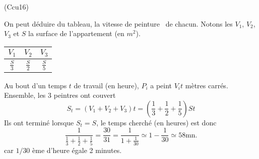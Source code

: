 \begin{tiny}(Ccu16)\end{tiny} On peut déduire du tableau, la \og vitesse de peinture\fg~ de chacun. Notons les $V_1$, $V_2$, $V_3$ et $S$ la surface de l'appartement (en $m^2$).
\begin{center}
\renewcommand{\arraystretch}{1.5}
\begin{tabular}{|c|c|c|} \hline
$V_1$           & $V_2$           & $V_3$\\ \hline
$\frac{S}{3}$   & $\frac{S}{2}$   & $\frac{S}{5}$ \\ \hline
\end{tabular}
\end{center}
Au bout d'un temps $t$ de travail (en heure), $P_i$ a peint $V_i t$ mètres carrés. Ensemble, les 3 peintres ont couvert
\[
 S_t = (V_1 + V_2 + V_3)t = (\frac{1}{3} + \frac{1}{2}+ \frac{1}{5})St
\]
Ils ont terminé lorsque $S_t = S$, le temps cherché (en heures) est donc
\[
 \frac{1}{\frac{1}{3} + \frac{1}{2}+ \frac{1}{5}} = \frac{30}{31} = \frac{1}{1+\frac{1}{30}}
 \simeq 1 - \frac{1}{30} \simeq 58 \text{mn}.
\]
car $1/30$ ème d'heure égale 2 minutes.